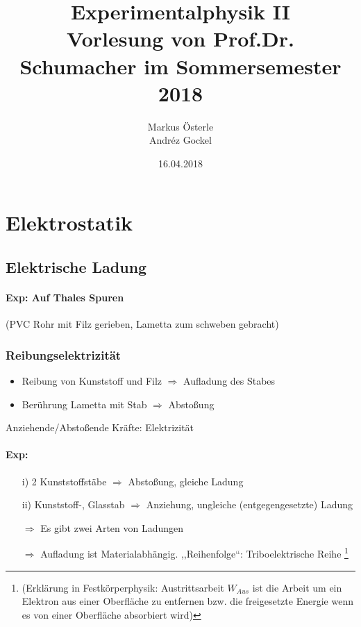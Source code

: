 \documentclass[titlepage,12pt,a4paper,ngerman]{report}
\begin{document}
\renewcommand{\thechapter}{\Roman{chapter}}

\title{
  {\Huge Experimentalphysik II }\\[1em]
  {\Large Vorlesung von Prof.Dr. Schumacher im Sommersemester 2018}}
\author{Markus Österle\\ Andréz Gockel}
\date{16.04.2018}
\maketitle
\tableofcontents


\chapter{Elektrostatik}
\section{Elektrische Ladung}
\subsubsection*{Exp: Auf Thales Spuren}
(PVC Rohr mit Filz gerieben, Lametta zum schweben gebracht)
\subsection{Reibungselektrizität}
\begin{itemize}
\item Reibung von Kunststoff und Filz $\Rightarrow$ Aufladung des Stabes
\item Berührung Lametta mit Stab $\Rightarrow$ Abstoßung
\end{itemize}
{\large Anziehende/Abstoßende Kräfte: Elektrizität}
\subsubsection*{Exp:}
\begin{itemize}
\item[i)] 2 Kunststoffstäbe $\Rightarrow$ Abstoßung, gleiche Ladung
\item[ii)] Kunststoff-, Glasstab $\Rightarrow$ Anziehung, ungleiche (entgegengesetzte) Ladung 
\end{itemize}

\begin{itemize}
\item[$\Rightarrow$] Es gibt zwei Arten von Ladungen
\item[$\Rightarrow$] Aufladung ist Materialabhängig. ,,Reihenfolge``: Triboelektrische   Reihe \footnote{(Erklärung in Festkörperphysik: Austrittsarbeit $W_{Aus}$ ist die Arbeit um ein Elektron aus einer Oberfläche zu entfernen bzw. die freigesetzte Energie wenn es von einer Oberfläche absorbiert wird)}
\end{itemize}
\end{document}
